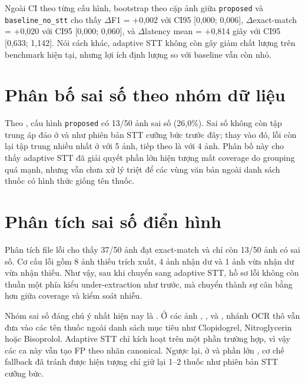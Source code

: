 \documentclass[12pt,a4paper]{report}
\begin{document}
Ngoài CI theo từng cấu hình, bootstrap theo cặp ảnh giữa \texttt{proposed} và \texttt{baseline\_no\_stt} cho thấy \(\Delta\)F1 = +0,002 với CI95 [0,000; 0,006], \(\Delta\)exact-match = +0,020 với CI95 [0,000; 0,060], và \(\Delta\)latency mean = +0,814 giây với CI95 [0,633; 1,142]. Nói cách khác, adaptive STT không còn gây giảm chất lượng trên benchmark hiện tại, nhưng lợi ích định lượng so với baseline vẫn còn nhỏ.

\section{Phân bố sai số theo nhóm dữ liệu}

Theo , cấu hình \texttt{proposed} có 13/50 ảnh sai số (26,0\%). Sai số không còn tập trung áp đảo ở  và  như phiên bản STT cưỡng bức trước đây; thay vào đó, lỗi còn lại tập trung nhiều nhất ở  với 5 ảnh, tiếp theo là  với 4 ảnh. Phân bố này cho thấy adaptive STT đã giải quyết phần lớn hiện tượng mất coverage do grouping quá mạnh, nhưng vẫn chưa xử lý triệt để các vùng văn bản ngoài danh sách thuốc có hình thức giống tên thuốc.

\section{Phân tích sai số điển hình}

Phân tích file lỗi  cho thấy 37/50 ảnh đạt exact-match và chỉ còn 13/50 ảnh có sai số. Cơ cấu lỗi gồm 8 ảnh thiếu trích xuất, 4 ảnh nhận dư và 1 ảnh vừa nhận dư vừa nhận thiếu. Như vậy, sau khi chuyển sang adaptive STT, hồ sơ lỗi không còn thuần một phía kiểu under-extraction như trước, mà chuyển thành sự cân bằng hơn giữa coverage và kiểm soát nhiễu.

Nhóm sai số đáng chú ý nhất hiện nay là . Ở các ảnh , ,  và , nhánh OCR thô vẫn đưa vào các tên thuốc ngoài danh sách mục tiêu như Clopidogrel, Nitroglycerin hoặc Bisoprolol. Adaptive STT chỉ kích hoạt trên một phần trường hợp, vì vậy các ca này vẫn tạo FP theo nhãn canonical. Ngược lại, ở  và phần lớn , cơ chế fallback đã tránh được hiện tượng chỉ giữ lại 1--2 thuốc như phiên bản STT cưỡng bức.
\end{document}
